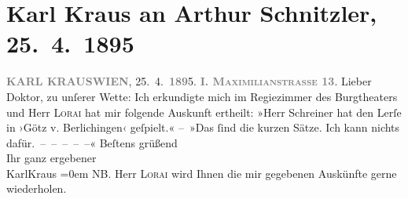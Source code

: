 

         
         \renewcommand{\erwaehntePersonen}{Personen: Christian Lorey, Jakob Schreiner}
         \renewcommand{\erwaehnteOrte}{Orte: Burgtheater, Mahlerstraße, Wien}
         \renewcommand{\erwaehnteWerke}{Werke: Götz von Berlichingen}
               \section[Karl Kraus an Arthur Schnitzler, 25. 4. 1895]{ Karl Kraus an Arthur Schnitzler, 25. 4. 1895}\nopagebreak{}\rehead{ }\begin{ledgroupsized}[t]{13cm}\normalsize\beginnumbering \toendnotes[C]{\smallbreak\pagebreak[2]} 
\toendnotes[C]{\smallbreak}\pstart
           \noindent{}{\pb}\textcolor{gray}{\textbf{KARL KRAUS}}\hfill \textcolor{gray}{\textbf{WIEN}}, 25. 4. \textcolor{gray}{\textbf{189}}5.\pend
           \pstart
           \raggedleft{}\textcolor{gray}{\textbf{\textsc{I. Maximilianstrasse 13}}}.\pend
           \pstart{}Lieber Doktor,\pend\pstart
           zu unſerer Wette:\pend
           \pstart
           Ich erkundigte mich im Regiezimmer des Burgtheaters und Herr \textsc{Lorai} hat mir folgende Auskunft ertheilt:\pend
           \pstart
           »Herr Schreiner hat den Lerſe in ›Götz
                  v. Berlichingen‹  geſpielt.«\pend
           \pstart
           – »Das ſind die kurzen Sätze. Ich kann nichts dafür. – – – – –«\pend
           \pstart
           Beſtens grüßend{\\[\baselineskip]}Ihr ganz ergebener{\\[\baselineskip]}\spacefill\mbox{KarlKraus}\pend
           \leftskip=0em{}\pstart
           \noindent{}\textsc{NB}. Herr \textsc{Lorai} wird Ihnen die mir gegebenen Auskünfte gerne wiederholen.\pend
           
         
         \endnumbering{}\end{ledgroupsized}  \newcommand{\dateiname}{L00432}\newcommand{\titel}{Karl Kraus an Arthur Schnitzler, 25. 4. 1895}\newcommand{\editorInnen}{Martin Anton Müller und Gerd-Hermann Susen}
      